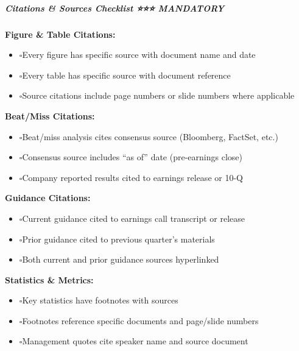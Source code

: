\documentclass[11pt]{article}
\newcommand{\UncheckedBox}{$\square$}
\begin{document}
\subparagraph{Citations \& Sources Checklist ⭐⭐⭐ MANDATORY}\mbox{}\par

\textbf{Figure \& Table Citations:}

\begin{itemize}[leftmargin=*,itemsep=2pt,topsep=2pt]
\item {} \UncheckedBox Every figure has specific source with document name and date
\item {} \UncheckedBox Every table has specific source with document reference
\item {} \UncheckedBox Source citations include page numbers or slide numbers where applicable
\end{itemize}

\textbf{Beat/Miss Citations:}

\begin{itemize}[leftmargin=*,itemsep=2pt,topsep=2pt]
\item {} \UncheckedBox Beat/miss analysis cites consensus source (Bloomberg, FactSet, etc.)
\item {} \UncheckedBox Consensus source includes ``as of'' date (pre-earnings close)
\item {} \UncheckedBox Company reported results cited to earnings release or 10-Q
\end{itemize}

\textbf{Guidance Citations:}

\begin{itemize}[leftmargin=*,itemsep=2pt,topsep=2pt]
\item {} \UncheckedBox Current guidance cited to earnings call transcript or release
\item {} \UncheckedBox Prior guidance cited to previous quarter's materials
\item {} \UncheckedBox Both current and prior guidance sources hyperlinked
\end{itemize}

\textbf{Statistics \& Metrics:}

\begin{itemize}[leftmargin=*,itemsep=2pt,topsep=2pt]
\item {} \UncheckedBox Key statistics have footnotes with sources
\item {} \UncheckedBox Footnotes reference specific documents and page/slide numbers
\item {} \UncheckedBox Management quotes cite speaker name and source document
\end{itemize}
\end{document}
